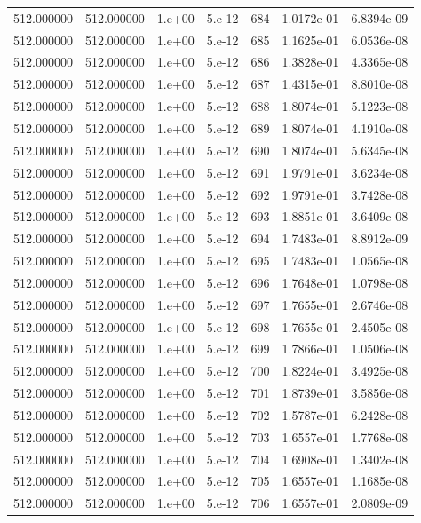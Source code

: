 \begin{table}[htbp]
\begin{tabular}{rrrrrrr}
512.000000 & 512.000000 & 1.e+00 & 5.e-12 & 684 & 1.0172e-01 & 6.8394e-09 \\
512.000000 & 512.000000 & 1.e+00 & 5.e-12 & 685 & 1.1625e-01 & 6.0536e-08 \\
512.000000 & 512.000000 & 1.e+00 & 5.e-12 & 686 & 1.3828e-01 & 4.3365e-08 \\
512.000000 & 512.000000 & 1.e+00 & 5.e-12 & 687 & 1.4315e-01 & 8.8010e-08 \\
512.000000 & 512.000000 & 1.e+00 & 5.e-12 & 688 & 1.8074e-01 & 5.1223e-08 \\
512.000000 & 512.000000 & 1.e+00 & 5.e-12 & 689 & 1.8074e-01 & 4.1910e-08 \\
512.000000 & 512.000000 & 1.e+00 & 5.e-12 & 690 & 1.8074e-01 & 5.6345e-08 \\
512.000000 & 512.000000 & 1.e+00 & 5.e-12 & 691 & 1.9791e-01 & 3.6234e-08 \\
512.000000 & 512.000000 & 1.e+00 & 5.e-12 & 692 & 1.9791e-01 & 3.7428e-08 \\
512.000000 & 512.000000 & 1.e+00 & 5.e-12 & 693 & 1.8851e-01 & 3.6409e-08 \\
512.000000 & 512.000000 & 1.e+00 & 5.e-12 & 694 & 1.7483e-01 & 8.8912e-09 \\
512.000000 & 512.000000 & 1.e+00 & 5.e-12 & 695 & 1.7483e-01 & 1.0565e-08 \\
512.000000 & 512.000000 & 1.e+00 & 5.e-12 & 696 & 1.7648e-01 & 1.0798e-08 \\
512.000000 & 512.000000 & 1.e+00 & 5.e-12 & 697 & 1.7655e-01 & 2.6746e-08 \\
512.000000 & 512.000000 & 1.e+00 & 5.e-12 & 698 & 1.7655e-01 & 2.4505e-08 \\
512.000000 & 512.000000 & 1.e+00 & 5.e-12 & 699 & 1.7866e-01 & 1.0506e-08 \\
512.000000 & 512.000000 & 1.e+00 & 5.e-12 & 700 & 1.8224e-01 & 3.4925e-08 \\
512.000000 & 512.000000 & 1.e+00 & 5.e-12 & 701 & 1.8739e-01 & 3.5856e-08 \\
512.000000 & 512.000000 & 1.e+00 & 5.e-12 & 702 & 1.5787e-01 & 6.2428e-08 \\
512.000000 & 512.000000 & 1.e+00 & 5.e-12 & 703 & 1.6557e-01 & 1.7768e-08 \\
512.000000 & 512.000000 & 1.e+00 & 5.e-12 & 704 & 1.6908e-01 & 1.3402e-08 \\
512.000000 & 512.000000 & 1.e+00 & 5.e-12 & 705 & 1.6557e-01 & 1.1685e-08 \\
512.000000 & 512.000000 & 1.e+00 & 5.e-12 & 706 & 1.6557e-01 & 2.0809e-09 \\

\end{tabular}
\end{table}
